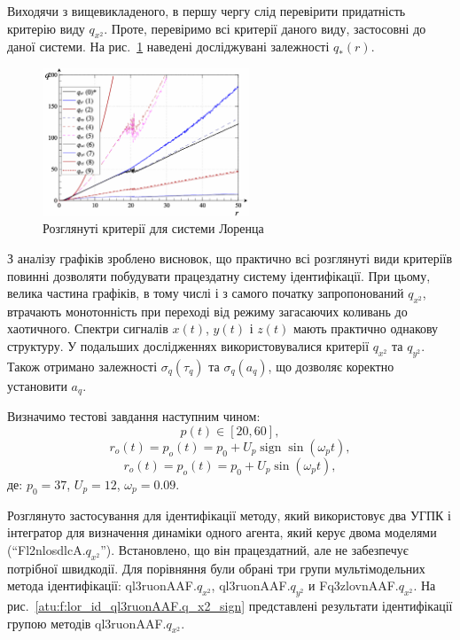 \documentclass[a4paper,13pt]{atuaref}
\DeclareMathOperator*{\sign}{sign}
\begin{document}
Виходячи з вищевикладеного, в першу чергу слід перевірити придатність критерію
виду $q_{x^2}$. Проте, перевіримо всі критерії даного виду, застосовні до
даної системи. На рис.~\ref{atu:f:lor_q} наведені досліджувані залежності
$q_{*}(r)$.

\begin{figure}[ht!]
  \centerline{\includegraphics[width=0.55\textwidth]{p5/p/cha/lor/lor_q-p_q_r_xl.png} }
  \vspace{-2.0ex}
  \caption{Розглянуті критерії для системи Лоренца}
  \label{atu:f:lor_q}
\end{figure}

З аналізу графіків зроблено висновок, що практично всі розглянуті види
критеріїв повинні дозволяти побудувати працездатну систему ідентифікації. При
цьому, велика частина графіків, в тому числі і з самого початку запропонований
$q_{x^2}$, втрачають монотонність при переході від режиму загасаючих
коливань до хаотичного.
Спектри сигналів $x(t)$, $y(t)$ і $z(t)$ мають практично однакову
структуру. У подальших дослідженнях використовувалися критерії
$q_{x^2}$ та
$q_{y^2}$.
Також отримано залежності $\sigma_q(\tau_q)$ та  $\sigma_q(a_q)$,
що дозволяє коректно установити $a_q$.

Визначимо тестові завдання наступним чином:
\[
  p(t) \in [20, 60],
\]
%
\begin{equation}
  r_o(t) = p_o(t) = p_0 +  U_{p} \sign \sin( \omega_{p} t ),
  \label{atu:eq:lor_po_t_sign}
\end{equation}
%
%
\begin{equation}
  r_o(t) = p_o(t) = p_0 +  U_{p} \sin( \omega_{p} t ),
  \label{atu:eq:lor_po_t_sin}
\end{equation}
%
де:
$p_0 = 37$, $U_p=12$, $\omega_p=0.09$.

Розглянуто застосування для ідентифікації методу,
який використовує два УГПК і інтегратор для визначення динаміки одного агента,
який керує двома моделями
(``Fl2nlosdlcA.$q_{x^2}$''). Встановлено, що він
працездатний, але
не забезпечує потрібної швидкодії.
Для порівняння були обрані три групи мультімодельних метода ідентифікації:
ql3ruonAAF.$q_{x^2}$,
ql3ruonAAF.$q_{y^2}$ и
Fq3zlovnAAF.$q_{x^2}$.
На рис.~\ref{atu:f:lor_id_ql3ruonAAF.q_x2_sign} представлені результати
ідентифікації групою методів ql3ruonAAF.$q_{x^2}$.
\end{document}
